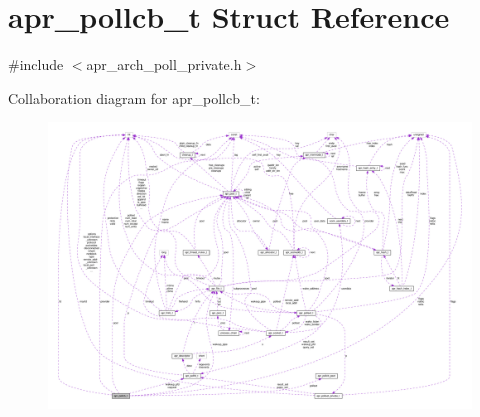 \hypertarget{structapr__pollcb__t}{}\section{apr\+\_\+pollcb\+\_\+t Struct Reference}
\label{structapr__pollcb__t}


{\ttfamily \#include $<$apr\+\_\+arch\+\_\+poll\+\_\+private.\+h$>$}



Collaboration diagram for apr\+\_\+pollcb\+\_\+t\+:
\nopagebreak
\begin{figure}[H]
\begin{center}
\leavevmode
\includegraphics[width=350pt]{structapr__pollcb__t__coll__graph}
\end{center}
\end{figure}
